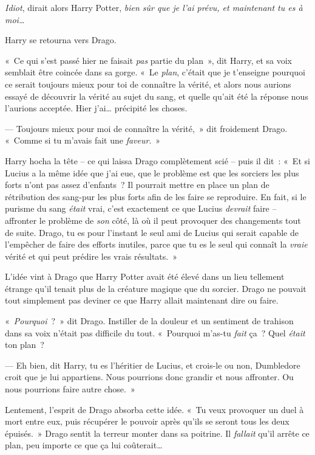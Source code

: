 \emph{Idiot}, dirait alors Harry Potter, \emph{bien sûr que je l'ai prévu, et maintenant tu es à moi…}

Harry se retourna vers Drago.

«~Ce qui s'est passé hier ne faisait \emph{pas} partie du plan~», dit Harry, et sa voix semblait être coincée dans sa gorge. «~Le \emph{plan}, c'était que je t'enseigne pourquoi ce serait toujours mieux pour toi de connaître la vérité, et alors nous aurions essayé de découvrir la vérité au sujet du sang, et quelle qu'ait été la réponse nous l'aurions acceptée. Hier j'ai… précipité les choses.

--- Toujours mieux pour moi de connaître la vérité,~» dit froidement Drago. «~Comme si tu m'avais fait une \emph{faveur}.~»

Harry hocha la tête -- ce qui laissa Drago complètement scié -- puis il dit~: «~Et si Lucius a la même idée que j'ai eue, que le problème est que les sorciers les plus forts n'ont pas assez d'enfants~? Il pourrait mettre en place un plan de rétribution des sang-pur les plus forts afin de les faire se reproduire. En fait, si le purisme du sang \emph{était} vrai, c'est exactement ce que Lucius \emph{devrait} faire -- affronter le problème de \emph{son} côté, là où il peut provoquer des changements tout de suite. Drago, tu es pour l'instant le seul ami de Lucius qui serait capable de l'empêcher de faire des efforts inutiles, parce que tu es le seul qui connaît la \emph{vraie} vérité et qui peut prédire les vrais résultats.~»

L'idée vint à Drago que Harry Potter avait été élevé dans un lieu tellement étrange qu'il tenait plus de la créature magique que du sorcier. Drago ne pouvait tout simplement pas deviner ce que Harry allait maintenant dire ou faire.

«~\emph{Pourquoi}~?~» dit Drago. Instiller de la douleur et un sentiment de trahison dans sa voix n'était pas difficile du tout. «~Pourquoi m'as-tu \emph{fait} ça~? Quel \emph{était} ton plan~?

--- Eh bien, dit Harry, tu es l'héritier de Lucius, et crois-le ou non, Dumbledore croit que je lui appartiens. Nous pourrions donc grandir et nous affronter. Ou nous pourrions faire autre chose.~»

Lentement, l'esprit de Drago absorba cette idée. «~Tu veux provoquer un duel à mort entre eux, puis récupérer le pouvoir après qu'ils se seront tous les deux épuisés.~» Drago sentit la terreur monter dans sa poitrine. Il \emph{fallait} qu'il arrête ce plan, peu importe ce que ça lui coûterait…

